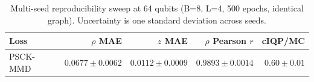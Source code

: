 \begin{table}[h]
  \centering
  \caption{Multi-seed reproducibility sweep at 64 qubits (B=8, L=4, 500 epochs, identical graph). Uncertainty is one standard deviation across seeds.}
  \begin{tabular}{lrrrr}
    \toprule
    Loss & $\rho$ MAE & $z$ MAE & $\rho$ Pearson $r$ & cIQP/MC \\
    \midrule
    PSCK-MMD & $0.0677\pm0.0062$ & $0.0112\pm0.0009$ & $0.9893\pm0.0014$ & $0.60\pm0.01$ \\
    \bottomrule
  \end{tabular}
\end{table}